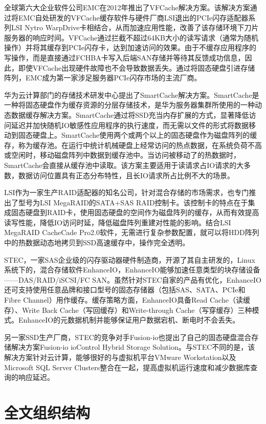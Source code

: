 全球第六大企业软件公司EMC在2012年推出了VFCache解决方案\cite{vfcache}。该解决方案通过将EMC自处研发的VFCache缓存软件与硬件厂商LSI退出的PCIe闪存适配器系列LSI Nytro WarpDrive卡相结合，从而加速应用性能，改善了该存储环境下刀片服务器的响应时间。VFCache通过拦截不超过64KB大小的读写请求（通常为随机操作）并将其缓存到PCIe闪存卡，达到加速访问的效果。由于不缓存应用程序的写操作，而是直接通过FCHBA卡写入后端SAN存储并等待其反馈成功信息，因此，即使VFCache出现硬件故障也不会导致数据丢失。通过将固态硬盘引进存储阵列，EMC成为第一家涉足服务器PCIe闪存市场的主流厂商。

华为云计算部门的存储技术研发中心提出了SmartCache解决方案\cite{smartcache}。SmartCache是一种将固态硬盘作为缓存资源的分层存储技术，是华为服务器集群所使用的一种动态数据缓存解决方案。SmartCache通过将SSD充当内存扩展的方式，显著降低访问延迟并加快随机IO敏感性应用程序的执行速度，而无需以文件的形式将数据移动到固态硬盘上。SmartCache使用两个或两个以上的固态硬盘作为磁盘阵列的缓存，称为缓存池。在运行中统计机械硬盘上经常访问的热点数据，在系统负荷不高或空闲时，移动磁盘阵列中数据到缓存池中。当访问被移动了的热数据时，SmartCache会直接从缓存池中读取。该方案主要适用于读请求占IO请求的大多数，数据访问位置具有正态分布特性，且长IO请求所占比例不大的场景。

LSI作为一家生产RAID适配器的知名公司，针对混合存储的市场需求，也专门推出了型号为LSI MegaRAID的SATA+SAS RAID控制卡。该控制卡的特点在于集成固态硬盘到RAID卡，使用固态硬盘的空间作为磁盘阵列的缓存，从而有效提高读写性能，降低IO访问时延，降低磁盘阵列重建对性能的影响。结合LSI MegaRAID CacheCade Pro2.0软件\cite{lsiraidcache}，无需进行复杂参数配置，就可以将HDD阵列中的热数据动态地拷贝到SSD高速缓存中，操作完全透明。

STEC，一家SAS企业级的闪存驱动器硬件制造商，开源了其自主研发的，Linux系统下的，混合存储软件EnhanceIO\cite{enhanceio}，EnhanceIO能够加速任意类型的块存储设备——DAS/RAID/iSCSI/FC SAN。虽然针对STEC自家的产品有优化，EnhanceIO还可支持使用任意品牌和接口型号的固态存储器（包括SAS、SATA、PCIe和Fibre Channel）用作缓存。缓存策略方面，EnhanceIO具备Read Cache（读缓存）、Write Back Cache（写回缓存）和Write-through Cache（写穿缓存）三种模式。EnhanceIO的元数据机制并能够保证用户数据宕机、断电时不会丢失。

另一家SSD生产厂商，STEC的竞争对手Fusion-io也提出了自己的固态硬盘混合存储解决方案Fusion-io ioControl Hybrid Storage Solution\cite{fusionio}。与STEC不同的是，该解决方案针对云计算，能够很好的与虚拟机平台VMware Workstation以及Microsoft SQL Server Clusters整合在一起，提高虚拟机运行速度和减少数据库查询的响应延迟。

\section{全文组织结构}
\label{sec:organization}

